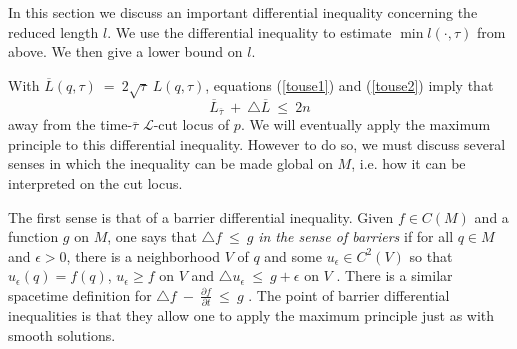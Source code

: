 \documentclass[12pt]{amsart}
\numberwithin{equation}{section}
\theoremstyle{plain}
\theoremstyle{definition}
\theoremstyle{remark}
\begin{document}
In this section we discuss an important differential inequality
concerning the reduced length $l$. We use the differential
inequality to estimate  $\min l(\cdot, \tau)$ from above.
We then give a lower bound on $l$.

With $\overline{L}(q, \tau) \: = \: 2 \sqrt{\tau} \: L(q, \tau)$, 
equations (\ref{touse1}) and (\ref{touse2}) imply that
\begin{equation} \label{barrier}
\overline{L}_{\overline{\tau}} \: + \: \triangle \overline{L}
\: \le \: 2n
\end{equation}
away from the time-$\overline{\tau}$ 
${\mathcal L}$-cut locus of $p$. 
We will eventually apply the maximum principle to this
differential inequality.  However to do so, we must 
discuss several  senses in which
the inequality can be made global on $M$, i.e. how it can be interpreted
on the cut locus.

The first sense is that of a barrier differential inequality.
Given $f \in C(M)$ and a function $g$ on $M$, one says that
$\triangle f \: \le \: g$ {\em in the sense of barriers}
if for all $q \in M$ and $\epsilon > 0$,
there is a neighborhood $V$ of $q$ and some $u_\epsilon \in C^2(V)$ so that 
 $u_\epsilon(q) = f(q)$, $u_\epsilon \ge f$ on $V$ and 
$\triangle u_\epsilon \: \le \: g + \epsilon$ on $V$
\cite{Calabi}. 
There is a similar spacetime definition for
$\triangle f \: -\: \frac{\partial f}{\partial t} \: \le \: g$
\cite{Dodziuk}. The point of barrier differential inequalities is
that they allow one to apply the maximum principle just as with
smooth solutions.
\end{document}
